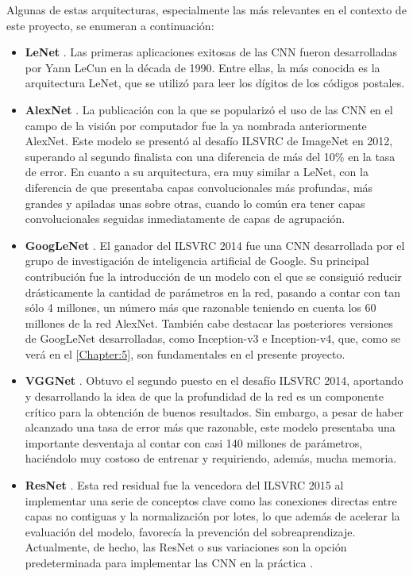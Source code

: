Algunas de estas arquitecturas, especialmente las más relevantes en el contexto de este proyecto, se enumeran a continuación:
\begin{itemize}
  \item \textbf{LeNet} \cite{LeNet-5}. Las primeras aplicaciones exitosas de las CNN fueron desarrolladas por Yann LeCun en la década de 1990. Entre ellas, la más conocida es la arquitectura LeNet, que se utilizó para leer los dígitos de los códigos postales.
  \item \textbf{AlexNet} \cite{Krizhevsky}. La publicación con la que se popularizó el uso de las CNN en el campo de la visión por computador fue la ya nombrada anteriormente AlexNet. Este modelo se presentó al desafío ILSVRC de ImageNet en 2012, superando al segundo finalista con una diferencia de más del 10\% en la tasa de error. En cuanto a su arquitectura, era muy similar a LeNet, con la diferencia de que presentaba capas convolucionales más profundas, más grandes y apiladas unas sobre otras, cuando lo común era tener capas convolucionales seguidas inmediatamente de capas de agrupación.
  \item \textbf{GoogLeNet} \cite{GoogleNet}. El ganador del ILSVRC 2014 fue una CNN desarrollada por el grupo de investigación de inteligencia artificial de Google. Su principal contribución fue la introducción de un modelo con el que se consiguió reducir drásticamente la cantidad de parámetros en la red, pasando a contar con tan sólo 4 millones, un número más que razonable teniendo en cuenta los 60 millones de la red AlexNet. También cabe destacar las posteriores versiones de GoogLeNet desarrolladas, como Inception-v3 e Inception-v4, que, como se verá en el \autoref{Chapter:5}, son fundamentales en el presente proyecto.
  \item \textbf{VGGNet} \cite{VGGNet}. Obtuvo el segundo puesto en el desafío ILSVRC 2014, aportando y desarrollando la idea de que la profundidad de la red es un componente crítico para la obtención de buenos resultados. Sin embargo, a pesar de  haber alcanzado una tasa de error más que razonable, este modelo presentaba una importante desventaja al contar con casi 140 millones de parámetros, haciéndolo muy costoso de entrenar y requiriendo, además, mucha memoria.
  \item \textbf{ResNet} \cite{ResNet}. Esta red residual fue la vencedora del ILSVRC 2015 al implementar una serie de conceptos clave como las conexiones directas entre capas no contiguas y la normalización por lotes, lo que además de acelerar la evaluación del modelo, favorecía la prevención del sobreaprendizaje. Actualmente, de hecho, las ResNet o sus variaciones son la opción predeterminada para implementar las CNN en la práctica \cite{ImpactResNet}.
\end{itemize}

